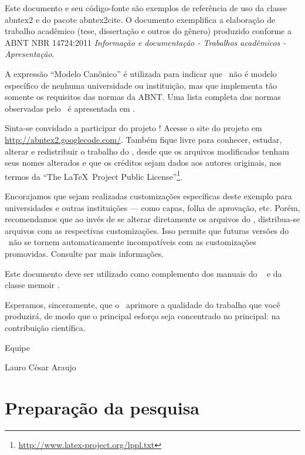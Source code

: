 \documentclass[
	12pt,                   %
	openright,              %
	oneside,                %
	a4paper,                %
	english,                %
	brazil                  %
	]{abntex2}
\begin{document}
  Este documento e seu código-fonte são exemplos de referência de uso da classe
  \textsf{abntex2} e do pacote \textsf{abntex2cite}. O documento
  exemplifica a elaboração de trabalho acadêmico (tese, dissertação e outros do
  gênero) produzido conforme a ABNT NBR 14724:2011 \emph{Informação e documentação
    - Trabalhos acadêmicos - Apresentação}.

  A expressão ``Modelo Canônico'' é utilizada para indicar que \abnTeX\ não é
  modelo específico de nenhuma universidade ou instituição, mas que implementa tão
  somente os requisitos das normas da ABNT. Uma lista completa das normas
  observadas pelo \abnTeX\ é apresentada em .

  Sinta-se convidado a participar do projeto \abnTeX! Acesse o site do projeto em
  \url{http://abntex2.googlecode.com/}. Também fique livre para conhecer,
  estudar, alterar e redistribuir o trabalho do \abnTeX, desde que os arquivos
  modificados tenham seus nomes alterados e que os créditos sejam dados aos
  autores originais, nos termos da ``The \LaTeX\ Project Public
  License''\footnote{\url{http://www.latex-project.org/lppl.txt}}.

  Encorajamos que sejam realizadas customizações específicas deste exemplo para
  universidades e outras instituições --- como capas, folha de aprovação, etc.
  Porém, recomendamos que ao invés de se alterar diretamente os arquivos do
  \abnTeX, distribua-se arquivos com as respectivas customizações.
  Isso permite que futuras versões do \abnTeX~não se tornem automaticamente
  incompatíveis com as customizações promovidas. Consulte
   par mais informações.

  Este documento deve ser utilizado como complemento dos manuais do \abnTeX\
  \cite{abntex2classe,abntex2cite,abntex2cite-alf} e da classe \textsf{memoir}
  \cite{memoir}.

  Esperamos, sinceramente, que o \abnTeX\ aprimore a qualidade do trabalho que
  você produzirá, de modo que o principal esforço seja concentrado no principal:
  na contribuição científica.

  Equipe \abnTeX

  Lauro César Araujo


  \part{Preparação da pesquisa}
\end{document}

